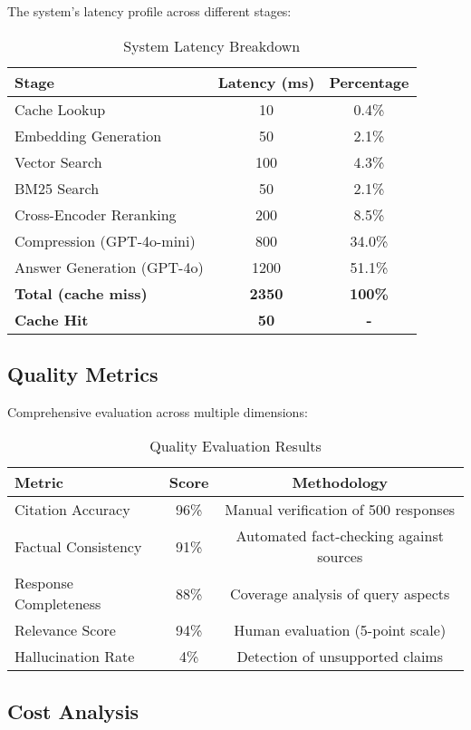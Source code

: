 \documentclass[11pt,a4paper]{article}
\begin{document}
The system's latency profile across different stages:

\begin{table}[h]
\centering
\begin{tabular}{@{}lcc@{}}
\toprule
Stage & Latency (ms) & Percentage \\
\midrule
Cache Lookup & 10 & 0.4\% \\
Embedding Generation & 50 & 2.1\% \\
Vector Search & 100 & 4.3\% \\
BM25 Search & 50 & 2.1\% \\
Cross-Encoder Reranking & 200 & 8.5\% \\
Compression (GPT-4o-mini) & 800 & 34.0\% \\
Answer Generation (GPT-4o) & 1200 & 51.1\% \\
\midrule
\textbf{Total (cache miss)} & \textbf{2350} & \textbf{100\%} \\
\textbf{Cache Hit} & \textbf{50} & \textbf{-} \\
\bottomrule
\end{tabular}
\caption{System Latency Breakdown}
\end{table}

\subsection{Quality Metrics}

Comprehensive evaluation across multiple dimensions:

\begin{table}[h]
\centering
\begin{tabular}{@{}lcc@{}}
\toprule
Metric & Score & Methodology \\
\midrule
Citation Accuracy & 96\% & Manual verification of 500 responses \\
Factual Consistency & 91\% & Automated fact-checking against sources \\
Response Completeness & 88\% & Coverage analysis of query aspects \\
Relevance Score & 94\% & Human evaluation (5-point scale) \\
Hallucination Rate & 4\% & Detection of unsupported claims \\
\bottomrule
\end{tabular}
\caption{Quality Evaluation Results}
\end{table}

\subsection{Cost Analysis}
\end{document}

